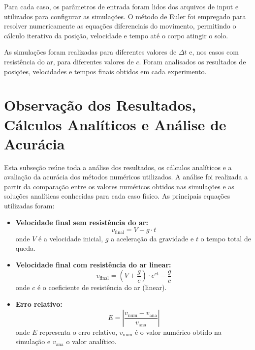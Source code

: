 Para cada caso, os parâmetros de entrada foram lidos dos arquivos de input e utilizados para configurar as simulações. O método de Euler foi empregado para resolver numericamente as equações diferenciais do movimento, permitindo o cálculo iterativo da posição, velocidade e tempo até o corpo atingir o solo.

As simulações foram realizadas para diferentes valores de $\Delta t$ e, nos casos com resistência do ar, para diferentes valores de $c$. Foram analisados os resultados de posições, velocidades e tempos finais obtidos em cada experimento.
\section{Observação dos Resultados, Cálculos Analíticos e Análise de Acurácia}

Esta subseção reúne toda a análise dos resultados, os cálculos analíticos e a avaliação da acurácia dos métodos numéricos utilizados. A análise foi realizada a partir da comparação entre os valores numéricos obtidos nas simulações e as soluções analíticas conhecidas para cada caso físico. As principais equações utilizadas foram:

\begin{itemize}
	\item \textbf{Velocidade final sem resistência do ar:}
	\begin{equation}
		v_{\text{final}} = V - g \cdot t
	\end{equation}
	onde $V$ é a velocidade inicial, $g$ a aceleração da gravidade e $t$ o tempo total de queda.
	\item \textbf{Velocidade final com resistência do ar linear:}
	\begin{equation}
		v_{\text{final}} = (V + \frac{g}{c}) \cdot e^{c t} - \frac{g}{c}
	\end{equation}
	onde $c$ é o coeficiente de resistência do ar (linear).
	\item \textbf{Erro relativo:}
	\begin{equation}
		E = \left| \frac{v_{\text{num}} - v_{\text{ana}}}{v_{\text{ana}}} \right|
	\end{equation}
	onde $E$ representa o erro relativo, $v_{\text{num}}$ é o valor numérico obtido na simulação e $v_{\text{ana}}$ o valor analítico.
\end{itemize}

